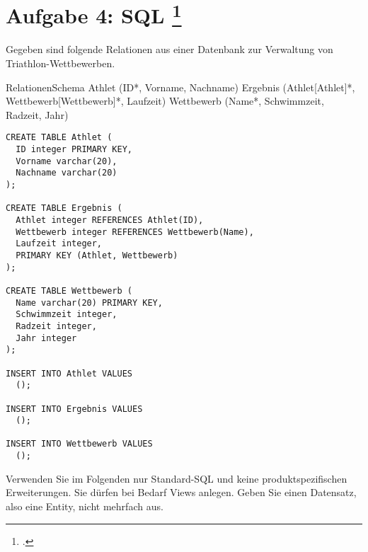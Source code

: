 \documentclass{lehramt-informatik-aufgabe}
\begin{document}
\section{Aufgabe 4: SQL
\footcite{66116:2018:09}}

Gegeben sind folgende Relationen aus einer Datenbank zur Verwaltung von
Triathlon-Wettbewerben.




\begin{liProjektSprache}{RelationenSchema}
Athlet (ID*, Vorname, Nachname)
Ergebnis (Athlet[Athlet]*, Wettbewerb[Wettbewerb]*, Laufzeit)
Wettbewerb (Name*, Schwimmzeit, Radzeit, Jahr)
\end{liProjektSprache}

\begin{liRmodell}
\end{liRmodell}

\begin{verbatim}
CREATE TABLE Athlet (
  ID integer PRIMARY KEY,
  Vorname varchar(20),
  Nachname varchar(20)
);

CREATE TABLE Ergebnis (
  Athlet integer REFERENCES Athlet(ID),
  Wettbewerb integer REFERENCES Wettbewerb(Name),
  Laufzeit integer,
  PRIMARY KEY (Athlet, Wettbewerb)
);

CREATE TABLE Wettbewerb (
  Name varchar(20) PRIMARY KEY,
  Schwimmzeit integer,
  Radzeit integer,
  Jahr integer
);

INSERT INTO Athlet VALUES
  ();

INSERT INTO Ergebnis VALUES
  ();

INSERT INTO Wettbewerb VALUES
  ();
\end{verbatim}

Verwenden Sie im Folgenden nur Standard-SQL und keine
produktspezifischen Erweiterungen. Sie dürfen bei Bedarf Views anlegen.
Geben Sie einen Datensatz, also eine Entity, nicht mehrfach aus.
\end{document}
